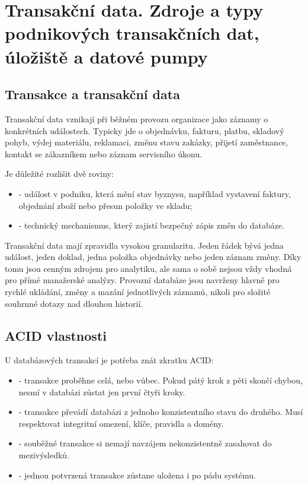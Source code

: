 \section{Transakční data. Zdroje a typy podnikových transakčních dat, úložiště a datové pumpy}

\subsection{Transakce a transakční data}
Transakční data vznikají při běžném provozu organizace jako záznamy o konkrétních událostech.
Typicky jde o objednávku, fakturu, platbu, skladový pohyb, výdej materiálu, reklamaci, změnu stavu
zakázky, přijetí zaměstnance, kontakt se zákazníkem nebo záznam servisního úkonu.

Je důležité rozlišit dvě roviny:
\begin{itemize}
  \item {} - událost v podniku, která mění stav byznysu, například vystavení
  faktury, objednání zboží nebo přesun položky ve skladu;
  \item {} - technický mechanismus, který zajistí bezpečný zápis změn
  do databáze.
\end{itemize}

Transakční data mají zpravidla vysokou granularitu. Jeden řádek bývá jedna událost, jeden doklad,
jedna položka objednávky nebo jeden záznam změny. Díky tomu jsou cenným zdrojem pro analytiku, ale
sama o sobě nejsou vždy vhodná pro přímé manažerské analýzy. Provozní databáze jsou navrženy hlavně
pro rychlé ukládání, změny a mazání jednotlivých záznamů, nikoli pro složité souhrnné dotazy nad
dlouhou historií.

\subsection{ACID vlastnosti}
U databázových transakcí je potřeba znát zkratku ACID:
\begin{itemize}
  \item {} - transakce proběhne celá, nebo vůbec. Pokud pátý krok z pěti skončí
  chybou, nesmí v databázi zůstat jen první čtyři kroky.
  \item {} - transakce převádí databázi z jednoho konzistentního stavu do druhého.
  Musí respektovat integritní omezení, klíče, pravidla a domény.
  \item {} - souběžné transakce si nemají navzájem nekonzistentně zasahovat do
  mezivýsledků.
  \item {} - jednou potvrzená transakce zůstane uložena i po pádu systému.
\end{itemize}

